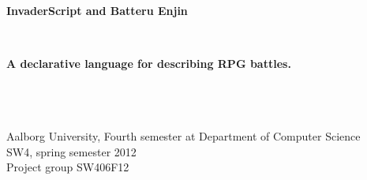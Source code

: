 \thispagestyle{empty}
\begin{center}
	\hrulefill\newline
	\\
	\begin{LARGE}	
	\textbf{InvaderScript and Batteru Enjin}
	\end{LARGE}
	\\
	\begin{large} 
	\textbf{A declarative language for describing RPG battles.}
	\end{large}\\
	\hrulefill\newline
	\\~\\
	Aalborg University, Fourth semester at Department of Computer Science \\
	SW4, spring semester 2012	\\
	Project group SW406F12\\
\end{center}
